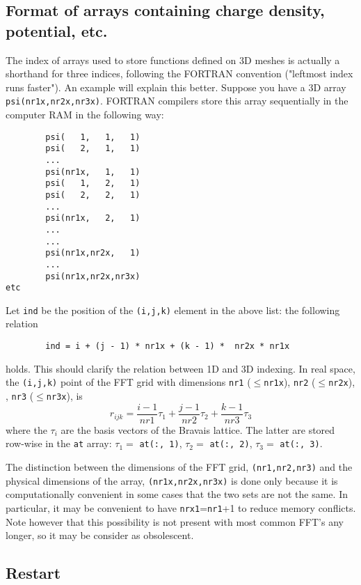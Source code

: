 \documentclass[12pt,a4paper]{article}
\begin{document}
\subsection{Format of arrays containing charge density, potential, etc.}
The index of arrays used to store functions defined on 3D meshes is
actually a shorthand for three indices, following the FORTRAN convention
("leftmost index runs faster"). An example will explain this better.
Suppose you have a 3D array \texttt{psi(nr1x,nr2x,nr3x)}. FORTRAN
compilers store this array sequentially  in the computer RAM in the
following way:
\begin{verbatim}
        psi(   1,   1,   1)
        psi(   2,   1,   1)
        ...
        psi(nr1x,   1,   1)
        psi(   1,   2,   1)
        psi(   2,   2,   1)
        ...
        psi(nr1x,   2,   1)
        ...
        ...
        psi(nr1x,nr2x,   1)
        ...
        psi(nr1x,nr2x,nr3x)
etc
\end{verbatim}
Let \texttt{ind} be the position of the \texttt{(i,j,k)} element in the above list:
the following relation
\begin{verbatim}
        ind = i + (j - 1) * nr1x + (k - 1) *  nr2x * nr1x
\end{verbatim}
holds. This should clarify the relation between 1D and 3D indexing. In real
space, the \texttt{(i,j,k)} point of the FFT grid with dimensions
\texttt{nr1} ($\le$\texttt{nr1x}),
\texttt{nr2}  ($\le$\texttt{nr2x}), , \texttt{nr3} ($\le$\texttt{nr3x}), is
$$
r_{ijk}=\frac{i-1}{nr1} \tau_1  +  \frac{j-1}{nr2} \tau_2 +
\frac{k-1}{nr3} \tau_3
$$
where the $\tau_i$ are the basis vectors of the Bravais lattice.
The latter are stored row-wise in the \texttt{at} array:
$\tau_1 = $ \texttt{at(:, 1)},
$\tau_2 = $ \texttt{at(:, 2)},
$\tau_3 = $ \texttt{at(:, 3)}.

The distinction between the dimensions of the FFT grid,
\texttt{(nr1,nr2,nr3)} and the physical dimensions of the array,
\texttt{(nr1x,nr2x,nr3x)} is done only because it is computationally
convenient in some cases that the two sets are not the same.
In particular, it may be convenient to have \texttt{nrx1}=\texttt{nr1}+1
to reduce memory conflicts. Note however that this possibility is not
present with most common FFT's any longer, so it may be consider
as obsolescent.

\subsection{Restart}
\end{document}
